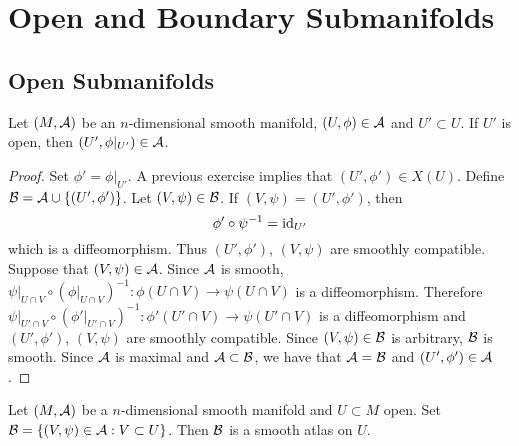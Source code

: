 \documentclass{book}
\begin{document}
	
	
	
	
	
	
	
	
	
	
	
	
	
	
	
	
	
	
	
	
	
	
	
	
	
	
	
	
	
\newpage
\section{Open and Boundary Submanifolds}

\subsection{Open Submanifolds}

\begin{ex} 
	Let $(M, \mathcal{A})$ be an $n$-dimensional smooth manifold, $(U, \phi) \in \mathcal{A}$ and $U' \subset U$. If $U'$ is open, then $(U', \phi|_{U'}) \in \mathcal{A}$. 
\end{ex}

\begin{proof}
	Set $\phi' = \phi|_{U'}$. A previous exercise implies that $(U', \phi') \in X(U)$. Define $\mathcal{B} = \mathcal{A} \cup \{(U', \phi')\}$. Let $(V, \psi) \in \mathcal{B}$. If $(V, \psi) = (U', \phi')$, then 
	$$\phi' \circ \psi^{-1} = \operatorname{id}_{U'}$$
	which is a diffeomorphism. Thus $(U', \phi')$, $(V, \psi)$ are smoothly compatible. Suppose that $(V, \psi) \in \mathcal{A}$. Since $\mathcal{A}$ is smooth, $\psi|_{U \cap V} \circ (\phi|_{U \cap V})^{-1}: \phi(U \cap V) \rightarrow \psi(U \cap V)$ is a diffeomorphism. Therefore $\psi|_{U' \cap V} \circ (\phi'|_{U' \cap V})^{-1}: \phi'(U' \cap V) \rightarrow \psi(U' \cap V)$ is a diffeomorphism and $(U', \phi')$, $(V, \psi)$ are smoothly compatible. Since $(V, \psi) \in \mathcal{B}$ is arbitrary, $\mathcal{B}$ is smooth. Since $\mathcal{A}$ is maximal and $\mathcal{A} \subset \mathcal{B}$, we have that $\mathcal{A} = \mathcal{B}$ and $(U', \phi') \in \mathcal{A}$.
\end{proof}

\begin{ex} 
	Let $(M, \mathcal{A})$ be a $n$-dimensional smooth manifold and $U \subset M$ open. Set $\mathcal{B} = \{(V, \psi) \in \mathcal{A}: V \subset U\}$. Then $\mathcal{B}$ is a smooth atlas on $U$.
\end{ex}
\end{document}
